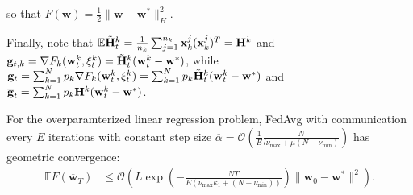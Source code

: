 so that $F(\mathbf{w})=\frac{1}{2}\|\mathbf{w}-\mathbf{w}^{\ast}\|_{H}^{2}$.

Finally, note that $\mathbb{E}\tilde{{\mathbf{H}}}_{t}^{k}=\frac{1}{n_{k}}\sum_{j=1}^{n_{k}}\mathbf{x}_{k}^{j}(\mathbf{x}_{k}^{j})^{T}={\mathbf{H}}^{k}$
and $\mathbf{g}_{t,k}=\nabla F_{k}(\mathbf{w}_{t}^{k},\xi_{t}^{k})=\tilde{{\mathbf{H}}}_{t}^{k}(\mathbf{w}_{t}^{k}-\mathbf{w}^{\ast})$,
while $\mathbf{g}_{t}=\sum_{k=1}^{N}p_{k}\nabla F_{k}(\mathbf{w}_{t}^{k},\xi_{t}^{k})=\sum_{k=1}^{N}p_{k}\tilde{{\mathbf{H}}}_{t}^{k}(\mathbf{w}_{t}^{k}-\mathbf{w}^{\ast})$ and $\overline{\mathbf{g}}_{t}=\sum_{k=1}^{N}p_{k}{\mathbf{H}}^{k}(\mathbf{w}_{t}^{k}-\mathbf{w}^{\ast})$.
\\
	\begin{thm}
		For the overparamterized linear regression problem, FedAvg with communication every $E$
		iterations with constant step size $\overline{\alpha}=\mathcal{O}(\frac{1}{E}\frac{N}{l\nu_{\max}+\mu(N-\nu_{\min})})$
		has geometric convergence:
		{\small  
		\begin{align*}
		\mathbb{E}F(\overline{\mathbf{w}}_{T}) & \leq\mathcal{O}\left(L\exp(-\frac{NT}{E(\nu_{\max}\kappa_{1}+(N-\nu_{\min}))})\|\mathbf{w}_{0}-\mathbf{w}^{\ast}\|^{2}\right).
		\end{align*}
		}%
	\end{thm}
